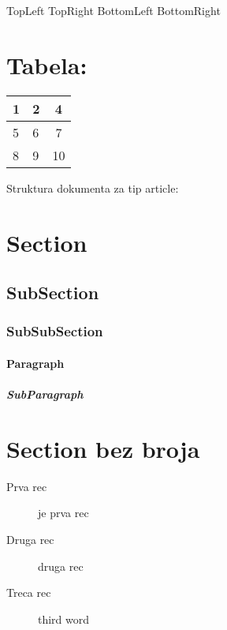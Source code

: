 \documentclass{article}
\begin{document}
TopLeft \hfill TopRight
\vfill
BottomLeft \hfill BottomRight

\section{Tabela:}
\begin{tabular} {|l|l|c|} %
\hline
		1 & 2 & 4 \\
		\hline
		5 & 6 & 7 \\
		\hline 
		8 & 9 & 10 \\
		\hline

\end{tabular}

Struktura dokumenta za tip article:
\section{Section}
\subsection{SubSection}
\subsubsection{SubSubSection}
\paragraph{Paragraph}
\subparagraph{SubParagraph}


\section*{Section bez broja}

\begin{description}
	\item[Prva rec] je prva rec
	\item[Druga rec] druga rec
	\item[Treca rec] third word
\end{description}
\end{document}
